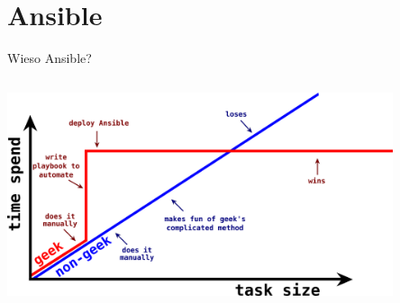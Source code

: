 \documentclass[aspectratio=169]{beamer}
\begin{document}
\section{Ansible} 
\begin{frame}{Wieso Ansible?}
    \begin{columns}
        \begin{column}{1.0\textwidth}
            \includegraphics[width=0.85\textwidth]{why_ansible.png}
        \end{column}
    \end{columns}
\end{frame}
\end{document}

